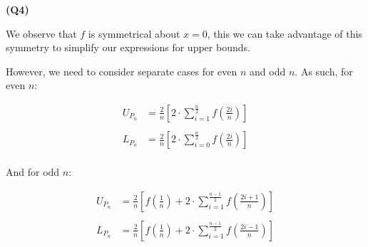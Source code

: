 \documentclass[12pt, a4paper]{article}
\begin{document}
\textbf{(Q4)}

We observe that $f$ is symmetrical about $x = 0$, this we can take
advantage of this symmetry to simplify our expressions for upper bounds.

However, we need to consider separate cases for even $n$ and odd $n$.
As such, for even $n$:

\begin{align*}
    U_{P_n} & = \frac{2}{n}\left[2 \cdot \sum_{i = 1}^{\frac{n}{2}}
    f\left(\frac{2i}{n}\right)\right]\\
    \\
    L_{P_n} & = \frac{2}{n}\left[2 \cdot \sum_{i = 0}^{\frac{n}{2}}
    f\left(\frac{2i}{n}\right)\right]\\
\end{align*}

And for odd $n$:

\begin{align*}
    U_{P_n} & = \frac{2}{n}\left[
        f\left(\frac{1}{n}\right) + 2 \cdot 
        \sum_{i = 1}^{\frac{n - 1}{2}}
    f\left(\frac{2i + 1}{n}\right)\right]\\
    \\
    L_{P_n} & = \frac{2}{n}\left[
        f\left(\frac{1}{n}\right) + 2 \cdot 
        \sum_{i = 1}^{\frac{n - 1}{2}}
    f\left(\frac{2i - 1}{n}\right)\right]\\
\end{align*}
\end{document}
